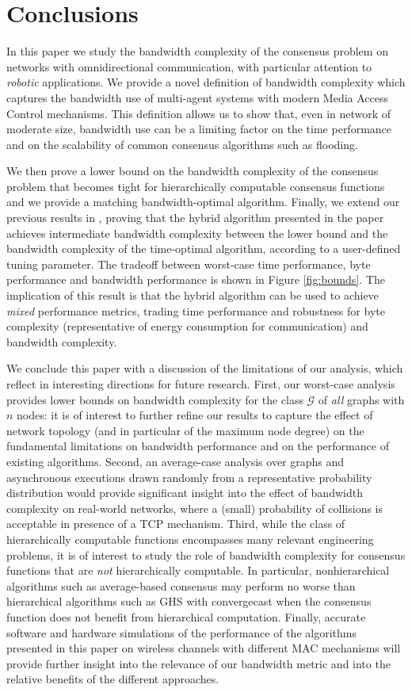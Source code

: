 \documentclass[letterpaper,10pt,conference]{ieeeconf}
\begin{document}
\section{Conclusions}
\label{sec:conclusions}
In this paper we study the bandwidth complexity of the consensus problem on networks with omnidirectional communication, with particular attention to \emph{robotic} applications. We provide a novel  definition of bandwidth complexity which captures the bandwidth use of multi-agent systems with  modern Media Access Control mechanisms. 
This definition allows us to show that, even in network of moderate size, bandwidth use can be a limiting factor on the time performance and on the scalability of common consensus algorithms such as flooding.

We then prove a lower bound on the bandwidth complexity of the consensus problem that becomes tight for hierarchically computable consensus functions and we provide a matching bandwidth-optimal algorithm. 
Finally, we extend our previous results in \cite{FR-MP:13}, proving that the hybrid algorithm presented in the paper achieves intermediate bandwidth complexity between the lower bound and the bandwidth complexity of the time-optimal algorithm, according to a user-defined tuning parameter. The tradeoff between worst-case time performance, byte performance and bandwidth performance is shown in Figure \ref{fig:bounds}. The implication of this result is that the hybrid algorithm can be used to achieve \emph{mixed} performance metrics, trading time performance and robustness for byte complexity (representative of energy consumption for communication) and bandwidth complexity.

We conclude this paper with a discussion of the limitations of our analysis, which reflect in interesting directions for future research. First, our worst-case analysis provides lower bounds on bandwidth complexity for the class $\mathcal{G}$ of \emph{all} graphs with $n$ nodes: it is of interest to further refine our results to capture the effect of network topology (and in particular of the maximum node degree) on the fundamental limitations on bandwidth performance and on the performance of existing algorithms. Second, an average-case analysis over graphs and asynchronous executions drawn randomly from a representative probability distribution would provide significant insight into the effect of bandwidth complexity on real-world networks, where a (small) probability of collisions is acceptable in presence of a TCP mechanism. Third, while the class of hierarchically computable functions encompasses many relevant engineering problems, it is of interest to study the role of bandwidth complexity for consensus functions that are \emph{not} hierarchically computable. In particular, nonhierarchical algorithms such as average-based consensus may perform no worse than hierarchical algorithms such as GHS with convergecast when the consensus function does not benefit from hierarchical computation. Finally, accurate software and hardware simulations of the performance of the algorithms presented in this paper on wireless channels with different MAC mechanisms will provide further insight into the relevance of our bandwidth metric and into the relative benefits of the different approaches.




\end{document}
